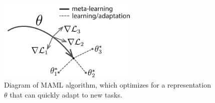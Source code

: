 \begin{figure}[t]
    \centering
    \includegraphics[width=0.6\textwidth]{figures/images/maml_weights.jpg}
    \caption{Diagram of MAML algorithm, which optimizes for a representation $\theta$ that can quickly adapt to new tasks.}
    \label{fig:maml_weights}
\end{figure}
